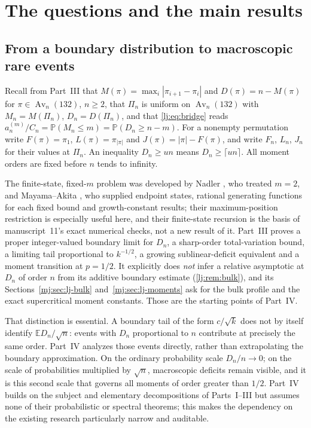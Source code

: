 \documentclass[11pt,a4paper]{article}
\theoremstyle{definition}\newaliascnt{definition}{theorem}
\theoremstyle{remark}\newaliascnt{remark}{theorem}
\newcommand{\Av}{\operatorname{Av}}
\newcommand{\ljP}{\mathbb P}
\newcommand{\ljE}{\mathbb E}
\begin{document}
\section{The questions and the main results}
\label{mj:sec:introduction}

\subsection{From a boundary distribution to macroscopic rare events}
Recall from Part~III that $M(\pi)=\max_i|\pi_{i+1}-\pi_i|$ and
$D(\pi)=n-M(\pi)$ for $\pi\in\Av_n(132)$, $n\ge2$, that $\Pi_n$ is uniform on
$\Av_n(132)$ with $M_n=M(\Pi_n)$, $D_n=D(\Pi_n)$, and that
\eqref{lj:eq:bridge} reads $a_n^{(m)}/C_n=\ljP(M_n\le m)=\ljP(D_n\ge n-m)$.
For a nonempty permutation write $F(\pi)=\pi_1$, $L(\pi)=\pi_{|\pi|}$ and
$J(\pi)=|\pi|-F(\pi)$, and write $F_n$, $L_n$, $J_n$ for their values at
$\Pi_n$. An inequality $D_n\ge un$ means $D_n\ge\lceil un\rceil$. All
moment orders are fixed before $n$ tends to infinity.

The finite-state, fixed-$m$ problem was developed by Nadler \cite{Nadler},
who treated $m=2$, and Mayama--Akita \cite{MayamaAkita}, who supplied endpoint
states, rational generating functions for each fixed bound and growth-constant
results; their maximum-position restriction is especially useful here, and
their finite-state recursion is the basis of manuscript~11's exact numerical
checks, not a new result of it. Part~III proves a proper integer-valued
boundary limit for $D_n$, a sharp-order total-variation bound, a limiting
tail proportional to $k^{-1/2}$, a growing sublinear-deficit equivalent and a
moment transition at $p=1/2$. It explicitly does \emph{not} infer a relative
asymptotic at $D_n$ of order $n$ from its additive boundary estimate
(\cref{lj:rem:bulk}), and its Sections~\ref{mj:sec:lj-bulk}
and~\ref{mj:sec:lj-moments} ask for the bulk profile and the exact
supercritical moment constants. Those are the starting points of Part~IV.

That distinction is essential. A boundary tail of the form $c/\sqrt k$ does
not by itself identify $\ljE D_n/\sqrt n$: events with $D_n$ proportional to
$n$ contribute at precisely the same order. Part~IV analyzes those events
directly, rather than extrapolating the boundary approximation. On the
ordinary probability scale $D_n/n\to0$; on the scale of probabilities
multiplied by $\sqrt n$, macroscopic deficits remain visible, and it is this
second scale that governs all moments of order greater than $1/2$. Part~IV
builds on the subject and elementary decompositions of Parts~I--III but
assumes none of their probabilistic or spectral theorems; this makes the
dependency on the existing research particularly narrow and auditable.
\end{document}
